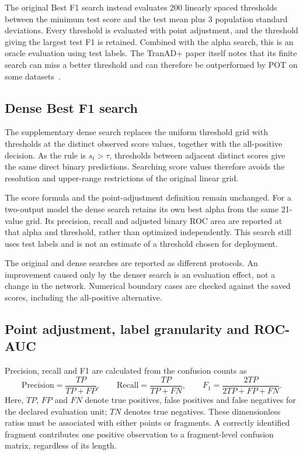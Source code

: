 The original Best F1 search instead evaluates \num{200} linearly spaced
thresholds between the minimum test score and the test mean plus
\num{3} population standard deviations. Every threshold is evaluated with
point adjustment, and the threshold giving the largest test F1 is retained.
Combined with the alpha search, this is an oracle evaluation using test
labels. The TranAD+ paper itself notes that its finite search can miss a
better threshold and can therefore be outperformed by POT on some
datasets~\cite{Yermakov2025TranADPlus}.

\subsection{Dense Best F1 search}
\label{sec:datasets-dense-thresholds}
The supplementary dense search replaces the uniform threshold grid with
thresholds at the distinct observed score values, together with the
all-positive decision. As the rule is \(s_t>\tau\), thresholds between adjacent distinct
scores give the same direct binary predictions. Searching score values
therefore avoids the resolution and upper-range restrictions of the
original linear grid.

The score formula and the point-adjustment definition remain unchanged.
For a two-output model the dense search retains its own best alpha from
the same \num{21}-value grid. Its precision, recall and adjusted binary
\ac{ROC} area are reported at that alpha and threshold, rather than
optimized independently. This search still uses test labels and is not
an estimate of a threshold chosen for deployment.

The original and dense searches are reported as different protocols.
An improvement caused only by the denser search is an evaluation effect,
not a change in the network. Numerical boundary cases are checked against
the saved scores, including the all-positive alternative.

\subsection{Point adjustment, label granularity and ROC-AUC}
\label{sec:datasets-point-adjustment}
Precision, recall and F1 are calculated from the confusion counts as
\begin{equation}
  \mathrm{Precision}=\frac{TP}{TP+FP},\qquad
  \mathrm{Recall}=\frac{TP}{TP+FN},\qquad
  F_1=\frac{2TP}{2TP+FP+FN}.
  \label{eq:datasets-classification-metrics}
\end{equation}
Here, \(TP\), \(FP\) and \(FN\) denote true positives, false positives and
false negatives for the declared evaluation unit; \(TN\) denotes true
negatives. These dimensionless ratios must be associated with either
points or fragments. A correctly identified fragment contributes one
positive observation to a fragment-level confusion matrix, regardless of
its length.

